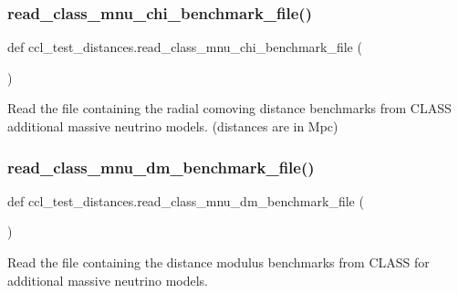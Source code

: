 \subsubsection{\texorpdfstring{read\+\_\+class\+\_\+mnu\+\_\+chi\+\_\+benchmark\+\_\+file()}{read\_class\_mnu\_chi\_benchmark\_file()}}
{\footnotesize\ttfamily def ccl\+\_\+test\+\_\+distances.\+read\+\_\+class\+\_\+mnu\+\_\+chi\+\_\+benchmark\+\_\+file (\begin{DoxyParamCaption}{ }\end{DoxyParamCaption})}

\begin{DoxyVerb}Read the file containing the radial comoving distance benchmarks from
CLASS additional massive neutrino models. (distances are in Mpc)
\end{DoxyVerb}
 \mbox{\label{namespaceccl__test__distances_a3c41444e8d68b50c2d1465464e08b5e2}} 
\subsubsection{\texorpdfstring{read\+\_\+class\+\_\+mnu\+\_\+dm\+\_\+benchmark\+\_\+file()}{read\_class\_mnu\_dm\_benchmark\_file()}}
{\footnotesize\ttfamily def ccl\+\_\+test\+\_\+distances.\+read\+\_\+class\+\_\+mnu\+\_\+dm\+\_\+benchmark\+\_\+file (\begin{DoxyParamCaption}{ }\end{DoxyParamCaption})}

\begin{DoxyVerb}Read the file containing the distance modulus benchmarks from
CLASS for additional massive neutrino models.
\end{DoxyVerb}
 \mbox{\label{namespaceccl__test__distances_a1eaf3545803a7803358f2ded10557990}} 
